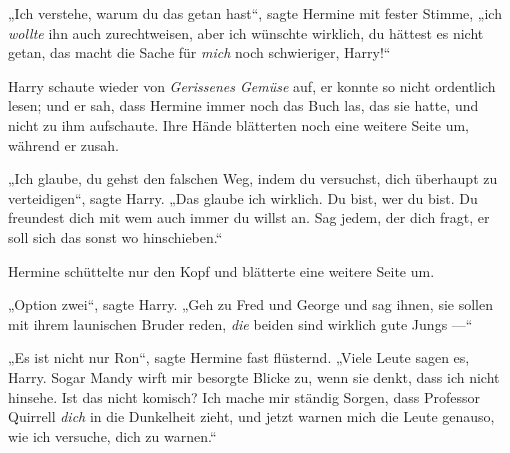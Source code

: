 „Ich verstehe, warum du das getan hast“, sagte Hermine mit fester Stimme, „ich \emph{wollte} ihn auch zurechtweisen, aber ich wünschte wirklich, du hättest es nicht getan, das macht die Sache für \emph{mich} noch schwieriger, Harry!“

Harry schaute wieder von \emph{Gerissenes Gemüse} auf, er konnte so nicht ordentlich lesen; und er sah, dass Hermine immer noch das Buch las, das sie hatte, und nicht zu ihm aufschaute. Ihre Hände blätterten noch eine weitere Seite um, während er zusah.

„Ich glaube, du gehst den falschen Weg, indem du versuchst, dich überhaupt zu verteidigen“, sagte Harry.
„Das glaube ich wirklich. Du bist, wer du bist. Du freundest dich mit wem auch immer du willst an. Sag jedem, der dich fragt, er soll sich das sonst wo hinschieben.“

Hermine schüttelte nur den Kopf und blätterte eine weitere Seite um.

„Option zwei“, sagte Harry.
„Geh zu Fred und George und sag ihnen, sie sollen mit ihrem launischen Bruder reden, \emph{die} beiden sind wirklich gute Jungs —“

„Es ist nicht nur Ron“, sagte Hermine fast flüsternd.
„Viele Leute sagen es, Harry. Sogar Mandy wirft mir besorgte Blicke zu, wenn sie denkt, dass ich nicht hinsehe. Ist das nicht komisch? Ich mache mir ständig Sorgen, dass Professor Quirrell \emph{dich} in die Dunkelheit zieht, und jetzt warnen mich die Leute genauso, wie ich versuche, dich zu warnen.“

